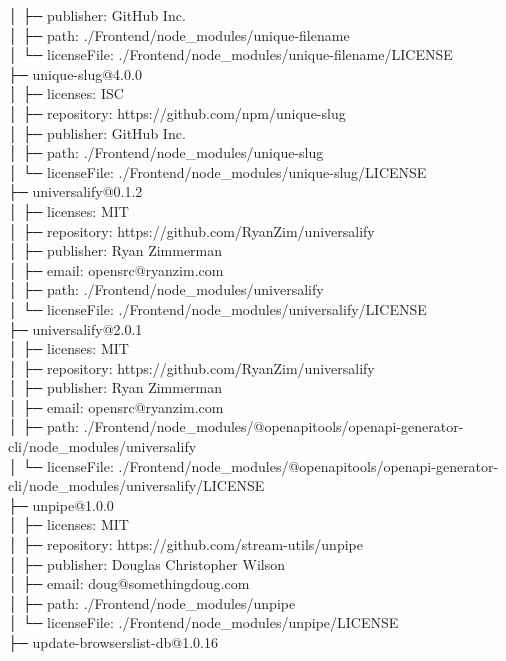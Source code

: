 │  ├─ publisher: GitHub Inc.\\
│  ├─ path: ./Frontend/node\_modules/unique-filename\\
│  └─ licenseFile: ./Frontend/node\_modules/unique-filename/LICENSE\\
├─ unique-slug@4.0.0\\
│  ├─ licenses: ISC\\
│  ├─ repository: https://github.com/npm/unique-slug\\
│  ├─ publisher: GitHub Inc.\\
│  ├─ path: ./Frontend/node\_modules/unique-slug\\
│  └─ licenseFile: ./Frontend/node\_modules/unique-slug/LICENSE\\
├─ universalify@0.1.2\\
│  ├─ licenses: MIT\\
│  ├─ repository: https://github.com/RyanZim/universalify\\
│  ├─ publisher: Ryan Zimmerman\\
│  ├─ email: opensrc@ryanzim.com\\
│  ├─ path: ./Frontend/node\_modules/universalify\\
│  └─ licenseFile: ./Frontend/node\_modules/universalify/LICENSE\\
├─ universalify@2.0.1\\
│  ├─ licenses: MIT\\
│  ├─ repository: https://github.com/RyanZim/universalify\\
│  ├─ publisher: Ryan Zimmerman\\
│  ├─ email: opensrc@ryanzim.com\\
│  ├─ path: ./Frontend/node\_modules/@openapitools/openapi-generator-cli/node\_modules/universalify\\
│  └─ licenseFile: ./Frontend/node\_modules/@openapitools/openapi-generator-cli/node\_modules/universalify/LICENSE\\
├─ unpipe@1.0.0\\
│  ├─ licenses: MIT\\
│  ├─ repository: https://github.com/stream-utils/unpipe\\
│  ├─ publisher: Douglas Christopher Wilson\\
│  ├─ email: doug@somethingdoug.com\\
│  ├─ path: ./Frontend/node\_modules/unpipe\\
│  └─ licenseFile: ./Frontend/node\_modules/unpipe/LICENSE\\
├─ update-browserslist-db@1.0.16\\
